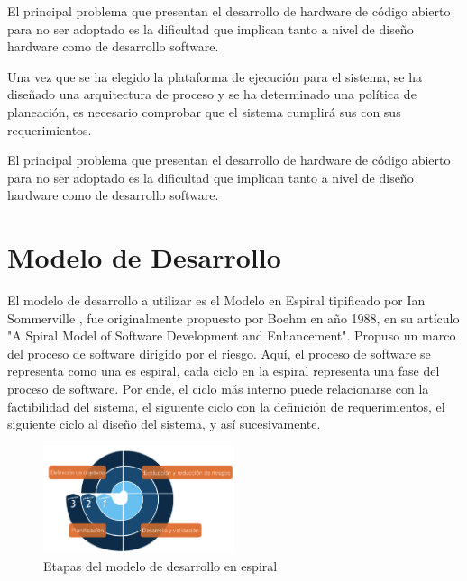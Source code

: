 El principal problema que  presentan el desarrollo de hardware de código abierto para no ser adoptado  es la dificultad que implican tanto a nivel de diseño hardware como de 
desarrollo software.
 
Una vez que se ha elegido la plataforma de ejecución para el sistema, se ha diseñado una arquitectura de proceso y se ha determinado una política de
planeación, es necesario comprobar que el sistema cumplirá sus con sus requerimientos.

El principal problema que  presentan el desarrollo de hardware de código abierto para no ser adoptado  es la dificultad que implican tanto a nivel de diseño hardware como de 
desarrollo software.

\section{Modelo de Desarrollo}

El modelo de desarrollo a utilizar es el Modelo en Espiral tipificado por Ian Sommerville\cite{Etiqueta00}%
, fue originalmente propuesto por Boehm en año 1988, en su artículo "A Spiral Model of Software Development and Enhancement". Propuso un
marco del proceso de software dirigido por el riesgo. Aquí, el proceso de software se representa como una es espiral, cada ciclo en la espiral
representa una fase del proceso de software. Por ende, el ciclo más interno puede relacionarse con la factibilidad del sistema, el siguiente ciclo
con la definición de requerimientos, el siguiente ciclo al diseño del sistema, y así sucesivamente. %

\begin{figure}[h!]
 \begin{center}
  \includegraphics[width=0.5\textwidth,keepaspectratio=true]{./images/ESPIRAL}
  \caption{Etapas del modelo de desarrollo en espiral}
  \label{fig:esquema}
 \end{center}
\end{figure}

